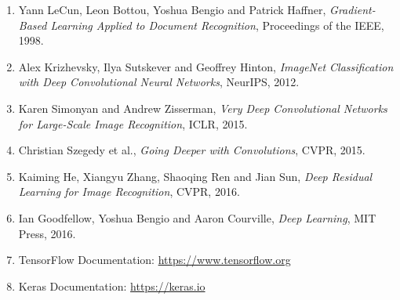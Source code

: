 \documentclass[11pt]{article}
\begin{document}
\begin{enumerate}

\item Yann LeCun, Leon Bottou, Yoshua Bengio and Patrick Haffner,
\emph{Gradient-Based Learning Applied to Document Recognition},
Proceedings of the IEEE, 1998.

\item Alex Krizhevsky, Ilya Sutskever and Geoffrey Hinton,
\emph{ImageNet Classification with Deep Convolutional Neural Networks},
NeurIPS, 2012.

\item Karen Simonyan and Andrew Zisserman,
\emph{Very Deep Convolutional Networks for Large-Scale Image Recognition},
ICLR, 2015.

\item Christian Szegedy et al.,
\emph{Going Deeper with Convolutions},
CVPR, 2015.

\item Kaiming He, Xiangyu Zhang, Shaoqing Ren and Jian Sun,
\emph{Deep Residual Learning for Image Recognition},
CVPR, 2016.

\item Ian Goodfellow, Yoshua Bengio and Aaron Courville,
\emph{Deep Learning},
MIT Press, 2016.

\item TensorFlow Documentation:
\url{https://www.tensorflow.org}

\item Keras Documentation:
\url{https://keras.io}

\end{enumerate}

\end{document}
